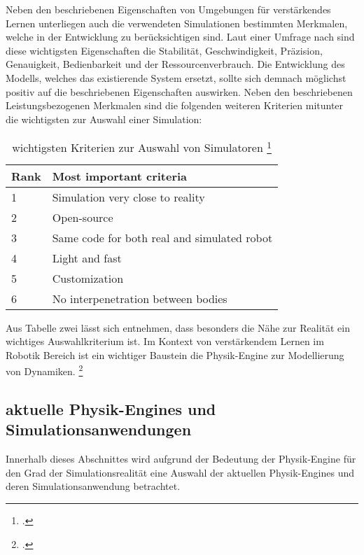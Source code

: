 Neben den beschriebenen Eigenschaften von Umgebungen für verstärkendes Lernen unterliegen auch die verwendeten Simulationen bestimmten Merkmalen, welche in der Entwicklung zu berücksichtigen sind.
Laut einer Umfrage nach \cite[]{Ivaldi.2272014} sind diese wichtigsten Eigenschaften die Stabilität, Geschwindigkeit, Präzision, Genauigkeit, Bedienbarkeit und der Ressourcenverbrauch.
Die Entwicklung des Modells, welches das existierende System ersetzt, sollte sich demnach möglichst positiv auf die beschriebenen Eigenschaften auswirken.
Neben den beschriebenen Leistungsbezogenen Merkmalen sind die folgenden weiteren Kriterien mitunter die wichtigsten zur Auswahl einer Simulation:

\begin{table}[H]
    \centering
    \begin{tabular}{|l|l|}
    \hline
    Rank & Most important criteria                     \\ \hline
    1    & Simulation very close to reality            \\
    2    & Open-source                                 \\
    3    & Same code for both real and simulated robot \\
    4    & Light and fast                              \\
    5    & Customization                               \\
    6    & No interpenetration between bodies          \\ \hline
    \end{tabular}
    \caption{wichtigsten Kriterien zur Auswahl von Simulatoren \footcite[][S. 4]{Ivaldi.2272014}}
    \label{tab:important-criteria}
\end{table}

Aus Tabelle zwei lässt sich entnehmen, dass besonders die Nähe zur Realität ein wichtiges Auswahlkriterium ist.
Im Kontext von verstärkendem Lernen im Robotik Bereich ist ein wichtiger Baustein die Physik-Engine zur Modellierung von Dynamiken. \footcite[Vgl.][S. 2]{Ayala.2020}

\subsection{aktuelle Physik-Engines und Simulationsanwendungen}
Innerhalb dieses Abschnittes wird aufgrund der Bedeutung der Physik-Engine für den Grad der Simulationsrealität eine Auswahl der aktuellen Physik-Engines und deren Simulationsanwendung betrachtet.

